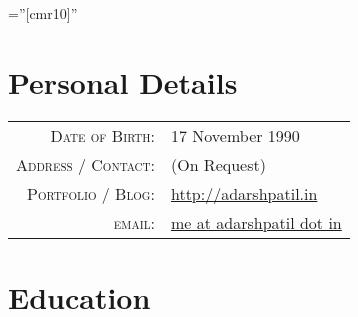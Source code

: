 \documentclass[a4paper,10pt]{article} %
\begin{document}
\pagestyle{empty} %

\font\fb=''[cmr10]'' %


\par{\bigskip\par} %

\section{Personal Details}

\begin{tabular}{rl}
\textsc{Date of Birth:} & 17 November 1990 \\
\textsc{Address / Contact:} & (On Request) \\
\textsc{Portfolio / Blog:} & \href{http://adarshpatil.in/timewarp}{http://adarshpatil.in}\\
\textsc{email:} & \href{mailto:me@adarshpatil.in}{me at adarshpatil dot in}
\end{tabular}


\section{Education}
\end{document}
